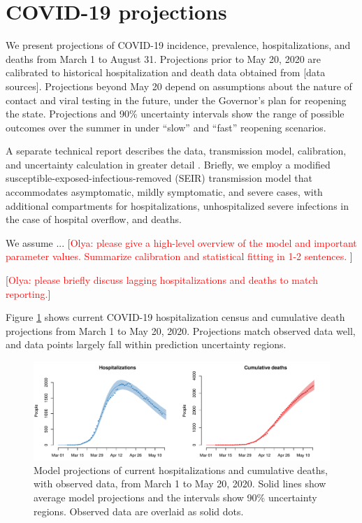 \documentclass[11pt]{article}
\newcommand{\comment}[1]{[\textcolor{red}{#1}]}
\begin{document}

\section*{COVID-19 projections} 

We present projections of COVID-19 incidence, prevalence, hospitalizations, and deaths from March 1 to August 31.  Projections prior to May 20, 2020 are calibrated to historical hospitalization and death data obtained from [data sources].  Projections beyond May 20 depend on assumptions about the nature of contact and viral testing in the future, under the Governor's plan for reopening the state.  Projections and 90\% uncertainty intervals show the range of possible outcomes over the summer in under ``slow'' and ``fast'' reopening scenarios.  

A separate technical report describes the data, transmission model, calibration, and uncertainty calculation in greater detail \citep{morozova2020tech}.  Briefly, we employ a modified susceptible-exposed-infectious-removed (SEIR) transmission model that accommodates asymptomatic, mildly symptomatic, and severe cases, with additional compartments for hospitalizations, unhospitalized severe infections in the case of hospital overflow, and deaths.  

We assume ... 
\comment{Olya: please give a high-level overview of the model and important parameter values. Summarize calibration and statistical fitting in 1-2 sentences. }

\comment{Olya: please briefly discuss lagging hospitalizations and deaths to match reporting.}

Figure \ref{fig:calibration} shows current COVID-19 hospitalization census and cumulative death projections from March 1 to May 20, 2020.  Projections match observed data well, and data points largely fall within prediction uncertainty regions. 


\begin{figure}
\centering
\includegraphics[width=\textwidth]{figures/calibration.pdf}
\caption{Model projections of current hospitalizations and cumulative deaths, with observed data, from March 1 to May 20, 2020. Solid lines show average model projections and the intervals show 90\% uncertainty regions.  Observed data are overlaid as solid dots.} 
\label{fig:calibration}
\end{figure}
\end{document}
